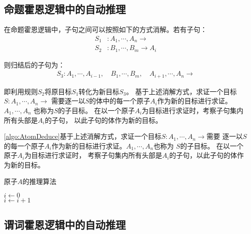 \subsection{命题霍恩逻辑中的自动推理}
在命题霍恩逻辑中，子句之间可以按照如下的方式消解。若有子句：
\begin{align*}
  S_1 &: A_1, \cdots , A_n \rightarrow \\
  S_2 &: B_1, \cdots, B_m \rightarrow A_i
\end{align*}

则归结后的子句为：
\begin{align*}
  S_3: A_1, \cdots , A_{i-1}, \quad B_1, \cdots , B_m,
  \quad A_{i+1}, \cdots , A_n \rightarrow
\end{align*}

即利用规则$S_2$将原目标$S_1$转化为新目标$S_3$。
基于上述消解方式，求证一个目标 $ S: A_1, \cdots , A_n \rightarrow $
需要逐一以$S$的体中的每一个原子$A_i$作为新的目标进行求证。$A_1, \cdots , A_n$
也称为$S$的子目标。
在以一个原子$A_i$为目标进行求证时，考察子句集内所有头部是$A_i$的子句，
以此子句的体作为新的目标。

\cref{algo:AtomDeduce}基于上述消解方式，求证一个目标$S: A_1, \cdots, A_n \rightarrow $需要
逐一以$S$的每一个原子$A_i$作为新的目标进行求证。$A_1,\cdots,A_n$也称为
$S$的子目标。
在以一个原子$A_i$为目标进行求证时，
考察子句集内所有头部是$A_i$的子句，以此子句的体作为新的目标。
\begin{algorithm}
  \caption{原子$A$的推理算法}
  \label{algo:AtomDeduce}
  \begin{algorithmic}[1]
    \State $i \gets 0$
     
     
    \State{} 
    \State{}
    \\
    \State{} 
    \EndIf
    \State $i \gets i + 1$ \\
    \EndIf
    \EndWhile
    \State{} 
    \EndFunction
  \end{algorithmic}
\end{algorithm}

\subsection{谓词霍恩逻辑中的自动推理}

